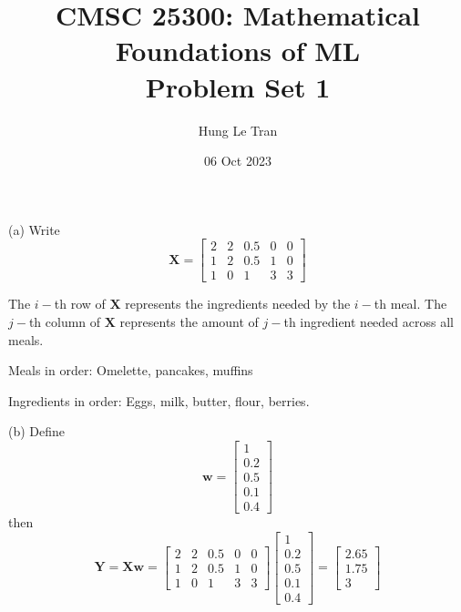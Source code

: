 \documentclass[a4paper, 12pt]{article}
\title{CMSC 25300: Mathematical Foundations of ML \\ \large Problem Set 1}
\date{06 Oct 2023}
\author{Hung Le Tran}
\begin{document}
\maketitle
\setcounter{section}{1}
\setcounter{problem}{1}
\begin{problem} 
\end{problem}
\begin{solution}
    (a) Write \[
        \mathbf{X} = \begin{bmatrix}
            2 & 2 & 0.5 & 0 & 0 \\
            1 & 2 & 0.5 & 1 & 0 \\
            1 & 0 & 1   & 3 & 3
        \end{bmatrix}
    \]

    The $i-$th row of $\mathbf{X}$ represents the ingredients needed by the $i-$th meal. The $j-$th column of $\mathbf{X}$ represents the amount of $j-$th ingredient needed across all meals.

    Meals in order: Omelette, pancakes, muffins


    Ingredients in order: Eggs, milk, butter, flour, berries.

    (b) Define \[
        \mathbf{w} = \begin{bmatrix}
            1   \\
            0.2 \\
            0.5 \\
            0.1 \\
            0.4
        \end{bmatrix}
    \]
    then \[
        \mathbf{Y} = \mathbf{Xw} = \begin{bmatrix}
            2 & 2 & 0.5 & 0 & 0 \\
            1 & 2 & 0.5 & 1 & 0 \\
            1 & 0 & 1   & 3 & 3
        \end{bmatrix}\begin{bmatrix}
            1   \\
            0.2 \\
            0.5 \\
            0.1 \\
            0.4
        \end{bmatrix} = \begin{bmatrix}
            2.65\\
            1.75\\
            3
        \end{bmatrix}
    \]


\end{solution}
\end{document}
